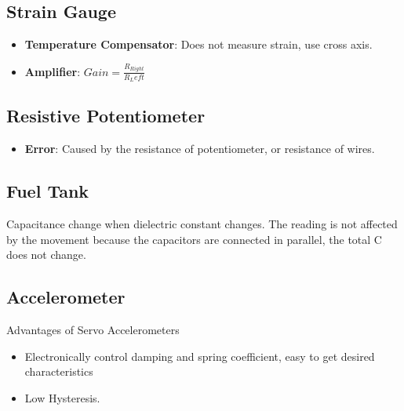 \documentclass{article}
\begin{document}
  \subsection{Strain Gauge}
  \begin{itemize}
  \item \textbf{Temperature Compensator}: Does not measure strain, use cross axis.
  \item \textbf{Amplifier}: $Gain = \frac{R_{Right}}{R_Left}$
  \end{itemize}
  
  \subsection{Resistive Potentiometer}
  \begin{itemize}
  \item \textbf{Error}: Caused by the resistance of potentiometer, or resistance of wires.
  \end{itemize}
  
  \subsection{Fuel Tank}
  Capacitance change when dielectric constant changes. The reading is not affected by the movement because the capacitors are connected in parallel, the total C does not change.
  
  \subsection{Accelerometer}
  Advantages of Servo Accelerometers
  \begin{itemize}
  \item Electronically control damping and spring coefficient, easy to get desired characteristics
  \item Low Hysteresis.
  \end{itemize}
  
\end{document}
